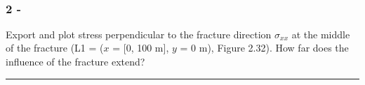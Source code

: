 \documentclass[8pt]{extarticle}
\begin{document}
    \begin{center}
    \end{center}
    { \hspace*{\fill} \\}
    
    \hypertarget{section*}{%
\subsubsection*{2 -}\label{section}}

Export and plot stress perpendicular to the fracture direction
\(\sigma_{xx}\) at the middle of the fracture (L1 = (\(x\) = {[}0, 100
m{]}, \(y\) = 0 m), Figure 2.32). How far does the influence of the
fracture extend?

\begin{center}\rule{0.5\linewidth}{0.5pt}\end{center}
\end{document}

